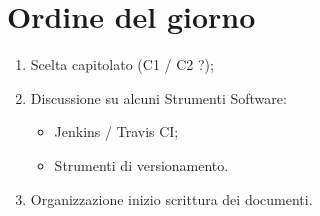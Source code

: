 \documentclass[../verbale-2016-12-07.tex]{subfiles}
\begin{document}
	
\section{Ordine del giorno}
	\begin{enumerate}
		\item Scelta capitolato (C1 / C2 ?);
		\item Discussione su alcuni Strumenti Software:
			\begin{itemize}
				\item Jenkins / Travis CI;
				\item Strumenti di versionamento.
			\end{itemize}
		\item Organizzazione inizio scrittura dei documenti.
	\end{enumerate}	
\end{document}
